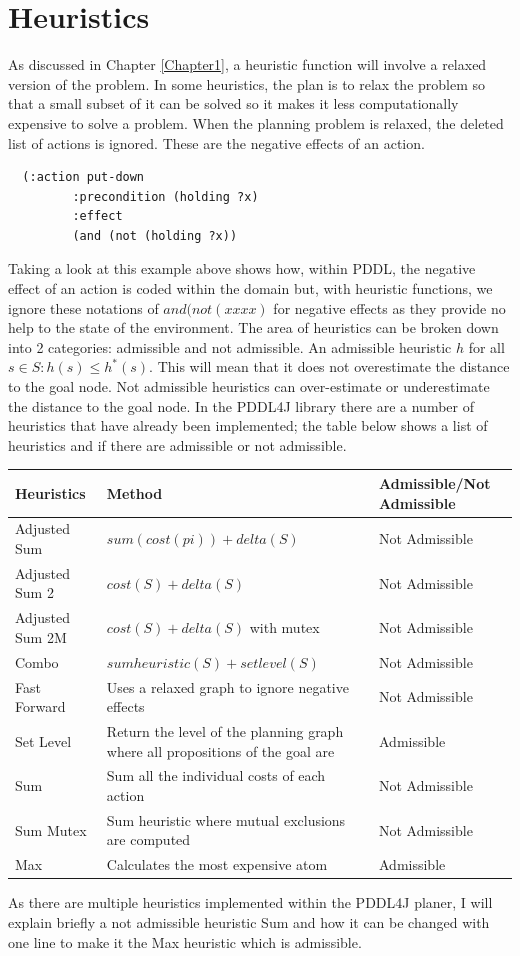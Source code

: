 \section{Heuristics}
As discussed in Chapter \ref{Chapter1}, a heuristic function will involve a relaxed version of the problem. In some heuristics, the plan is to relax the problem so that a small subset of it can be solved so it makes it less computationally expensive to solve a problem. When the planning problem is relaxed, the deleted list of actions is ignored. These are the negative effects of an action.\cite{IgnoringDeleteLists} 
\begin{verbatim}
  (:action put-down
	     :precondition (holding ?x)
	     :effect
	     (and (not (holding ?x))
\end{verbatim} 
Taking a look at this example above shows how, within PDDL, the negative effect of an action is coded within the domain but, with heuristic functions, we ignore these notations of $and(not(xxxx)$ for negative effects as they provide no help to the state of the environment.
The area of heuristics can be broken down into 2 categories: admissible and not admissible. An admissible heuristic $h$ for all $s \in S: h(s) \leq h^*(s)$. This will mean that it does not overestimate the distance to the goal node. Not admissible heuristics can over-estimate or underestimate the distance to the goal node. 
In the PDDL4J library there are a number of heuristics that have already been implemented; the table below shows a list of heuristics and if there are admissible or not admissible.
\begin{center}
  \begin{tabular}{ | l | p{3cm} | l |}
    \hline
    \textbf{Heuristics} & \textbf{Method} & \textbf{Admissible/Not Admissible} \\ \hline
    Adjusted Sum & $sum(cost(pi)) + delta(S)$ & Not Admissible  \\ \hline
    Adjusted Sum 2 & $cost(S) + delta(S)$ & Not Admissible  \\ \hline
    Adjusted Sum 2M & $cost(S) + delta(S)$ with mutex& Not Admissible  \\ \hline
    Combo & $sumheuristic(S) + setlevel(S)$& Not Admissible  \\ \hline
    Fast Forward & Uses a relaxed graph to ignore negative effects & Not Admissible  \\ \hline
    Set Level & Return the level of the planning graph where all propositions of the goal are & Admissible \\ \hline
    Sum & Sum all the individual costs of each action &Not Admissible \\ \hline
    Sum Mutex & Sum heuristic where mutual exclusions are computed & Not Admissible \\ \hline
    Max & Calculates the most expensive atom & Admissible \\ 
    \hline
  \end{tabular}
\end{center}
As there are multiple heuristics implemented within the PDDL4J planer, I will explain briefly a not admissible heuristic Sum and how it can be changed with one line to make it the Max heuristic which is admissible. 
